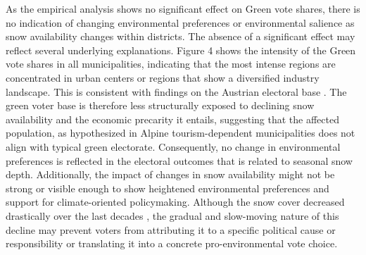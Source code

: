 \documentclass{article}
\begin{document}
As the empirical analysis shows no significant effect on Green vote shares, there is no indication of changing environmental preferences or environmental salience as snow availability changes within districts. The absence of a significant effect may reflect several underlying explanations. Figure 4 shows the intensity of the Green vote shares in all municipalities, indicating that the most intense regions are concentrated in urban centers or regions that show a diversified industry landscape. This is consistent with findings on the Austrian electoral base \parencite{kritzinger2013}.
The green voter base is therefore less structurally exposed to declining snow availability and the economic precarity it entails, suggesting that the affected population, as hypothesized in Alpine tourism-dependent municipalities does not align with typical green electorate. Consequently, no change in environmental preferences is reflected in the electoral outcomes that is related to seasonal snow depth. Additionally, the impact of changes in snow availability might not be strong or visible enough to show heightened environmental preferences and support for climate-oriented policymaking. Although the snow cover decreased drastically over the last decades \parencite{Olefs2020}, the gradual and slow-moving nature of this decline may prevent voters from attributing it to a specific political cause or responsibility or translating it into a concrete pro-environmental vote choice. 
\end{document}
